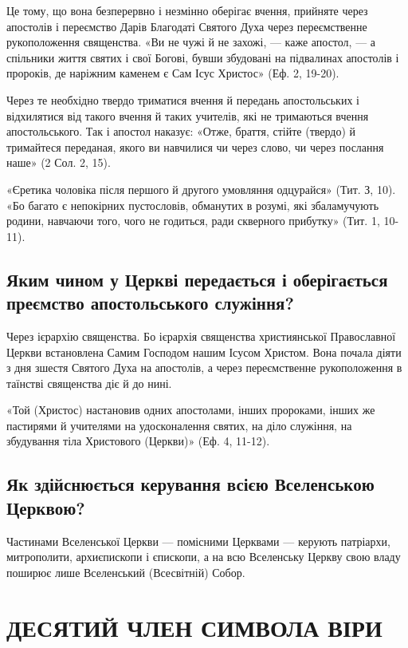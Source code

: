 \documentclass[main.tex]{subfiles}
\begin{document}
Це тому, що вона безперервно і незмінно оберігає вчення, прийняте через апостолів і переємство Дарів Благодаті Святого Духа через переємственне рукоположення священства. «Ви не чужі й не захожі, — каже апостол, — а спільники життя святих і свої Богові, бувши збудовані на підвалинах апостолів і пророків, де наріжним каменем є Сам Ісус Христос» (Еф. 2, 19-20).

Через те необхідно твердо триматися вчення й передань апостольських і відхилятися від такого вчення й таких учителів, які не тримаються вчення апостольського. Так і апостол наказує: «Отже, браття, стійте (твердо) й тримайтеся переданая, якого ви навчилися чи через слово, чи через послання наше» (2 Сол. 2, 15).

«Єретика чоловіка після першого й другого умовляння одцурайся» (Тит. З, 10). «Бо багато є непокірних пустословів, обманутих в розумі, які збаламучують родини, навчаючи того, чого не годиться, ради скверного прибутку» (Тит. 1, 10-11).

\subsection{Яким чином у Церкві передається і оберігається преємство апостольського служіння?}

Через ієрархію священства. Бо ієрархія священства християнської Православної Церкви встановлена Самим Господом нашим Ісусом Христом. Вона почала діяти з дня зшестя Святого Духа на апостолів, а через переємственне рукоположення в таїнстві священства діє й до нині.

«Той (Христос) настановив одних апостолами, інших пророками, інших же пастирями й учителями на удосконалення святих, на діло служіння, на збудування тіла Христового (Церкви)» (Еф. 4, 11-12).

\subsection{Як здійснюється керування всією Вселенською Церквою?}

Частинами Вселенської Церкви — помісними Церквами — керують патріархи, митрополити, архиєпископи і єпископи, а на всю Вселенську Церкву свою владу поширює лише Вселенський (Всесвітній) Собор.

\section{ДЕСЯТИЙ ЧЛЕН СИМВОЛА ВІРИ}
\end{document}
